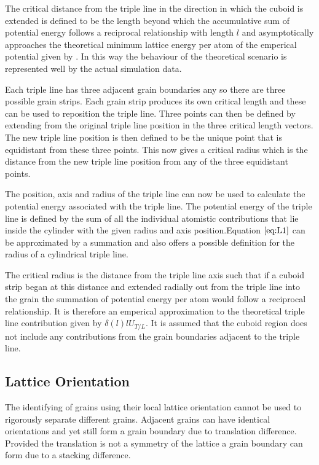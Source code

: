 \documentclass[12pt,a4paper]{book}
\begin{document}
The critical distance from the triple line in the direction in which the cuboid is extended is defined to be the length beyond which the accumulative sum of potential energy follows a reciprocal relationship with length $l$ and asymptotically approaches the theoretical minimum lattice energy per atom of the emperical potential given by \cite{Zope2003}. In this way the behaviour of the theoretical scenario is represented well by the actual simulation data.

Each triple line has three adjacent grain boundaries any so there are three possible grain strips. Each grain strip produces its own critical length and these can be used to reposition the triple line. Three points can then be defined by extending from the original triple line position in the three critical length vectors. The new triple line position is then defined to be the unique point that is equidistant from these three points. This now gives a critical radius which is the distance from the new triple line position from any of the three equidistant points.

The position, axis and radius of the triple line can now be used to calculate the potential energy associated with the triple line. The potential energy of the triple line is defined by the sum of all the individual atomistic contributions that lie inside the cylinder with the given radius and axis position.Equation $\ref{eq:L1}$ can be approximated by a summation and also offers a possible definition for the radius of a cylindrical triple line.

The critical radius is the distance from the triple line axis such that if a cuboid strip began at this distance and extended radially out from the triple line into the grain the summation of potential energy per atom would follow a reciprocal relationship.   It is therefore an emperical approximation to the theoretical triple line contribution given by $\delta(l) l U_{T/L}$. It is assumed that the cuboid region does not include any contributions from the grain boundaries adjacent to the triple line.




\subsection{Lattice Orientation}

The identifying of grains using their local lattice orientation cannot be used to rigorously separate different grains. Adjacent grains can have identical orientations and yet still form a grain boundary due to translation difference. Provided the translation is not a symmetry of the lattice a grain boundary can form due to a stacking difference.
\end{document}
